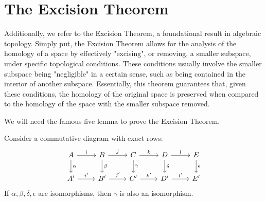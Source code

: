 \section{The Excision Theorem}
Additionally, we refer to the Excision Theorem, a foundational result in
algebraic topology. Simply put, the Excision Theorem allows for the analysis of
the homology of a space by effectively "excising", or removing, a smaller
subspace, under specific topological conditions. These conditions usually
involve the smaller subspace being "negligible" in a certain sense, such as being
contained in the interior of another subspace. Essentially, this theorem guarantees
that, given these conditions, the homology of the original space is preserved when
compared to the homology of the space with the smaller subspace removed.

We will need the famous five lemma to prove the Excision Theorem.

\begin{lemma}{\cite[p.120]{hatcher2005algebraic}}
	\label{fivelemma} Consider a commutative diagram with exact rows:
	\begin{equation}
		\begin{tikzcd}
			A \arrow[r, "i"] \arrow[d, "\alpha"] & B \arrow[r, "j"] \arrow[d, "\beta"]
			& C \arrow[r, "k"] \arrow[d, "\gamma"] & D \arrow[r, "l"] \arrow[d, "\delta"]
			& E \arrow[d, "\epsilon"] \\ A' \arrow[r, "i'"] & B' \arrow[r, "j'"] & C'
			\arrow[r, "k'"] & D' \arrow[r, "l'"] & E'
		\end{tikzcd}
	\end{equation}
	If $\alpha, \beta, \delta, \epsilon$ are isomorphisms, then $\gamma$ is also an
	isomorphism.
\end{lemma}

